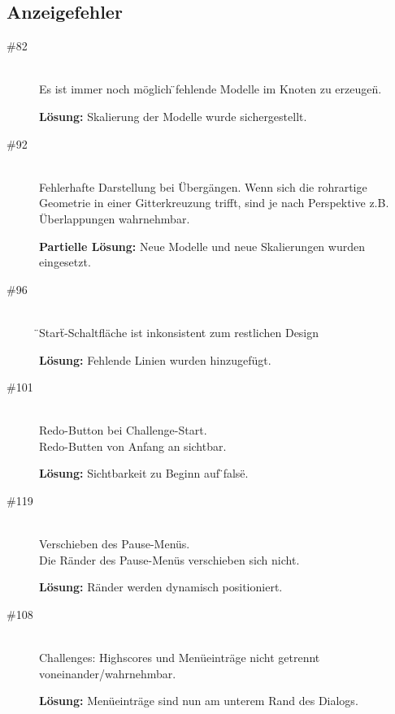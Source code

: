 %



\subsection*{Anzeigefehler}
\begin{description}


\item[\#82] \hfill \\
Es ist immer noch möglich \"{}fehlende Modelle im Knoten zu erzeugen\"{}.

{\bfseries Lösung:} Skalierung der Modelle wurde sichergestellt.

\item[\#92] \hfill \\
Fehlerhafte Darstellung bei Übergängen. Wenn sich die rohrartige Geometrie in einer Gitterkreuzung trifft, sind je nach Perspektive z.B. Überlappungen wahrnehmbar.

{\bfseries Partielle Lösung:} Neue Modelle und neue Skalierungen wurden eingesetzt.


\item[\#96] \hfill \\
\"{}Start\"{}-Schaltfläche ist inkonsistent zum restlichen Design

{\bfseries Lösung:} Fehlende Linien wurden hinzugefügt.

 \item[\#101] \hfill \\
 Redo-Button bei Challenge-Start.\\
 Redo-Butten von Anfang an sichtbar.
 
 {\bfseries Lösung:} Sichtbarkeit zu Beginn auf \"{}false\"{}.
 
\item[\#119] \hfill \\
Verschieben des Pause-Menüs. \\
Die Ränder des Pause-Menüs verschieben sich nicht.

{\bfseries Lösung:} Ränder werden dynamisch positioniert. 

 

\item[\#108] \hfill \\
 Challenges: Highscores und Menüeinträge nicht getrennt
  voneinander/wahrnehmbar.
 
 {\bfseries Lösung:} Menüeinträge sind nun am unterem Rand des Dialogs.
 
\end{description}
~\\


